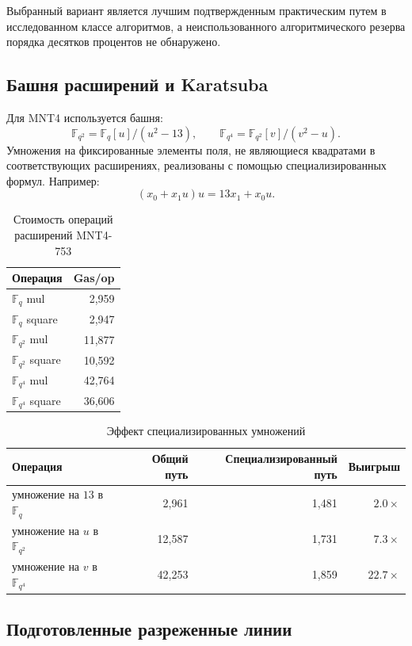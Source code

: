 \documentclass[12pt,a4paper]{article}
\newcommand{\Fq}{\mathbb{F}_q}
\begin{document}
Выбранный вариант является лучшим подтвержденным практическим путем в исследованном классе алгоритмов, а неиспользованного алгоритмического резерва порядка десятков процентов не обнаружено.

\subsection{Башня расширений и Karatsuba}

Для MNT4 используется башня:
\[
    \mathbb{F}_{q^2}=\Fq[u]/(u^2-13),
    \qquad
    \mathbb{F}_{q^4}=\mathbb{F}_{q^2}[v]/(v^2-u).
\]
Умножения на фиксированные элементы поля, не являющиеся квадратами в соответствующих расширениях, реализованы с помощью специализированных формул. Например:
\[
    (x_0+x_1u)u=13x_1+x_0u.
\]

\begin{table}[htbp]
\centering
\caption{Стоимость операций расширений MNT4-753}
\small
\begin{tabular}{l r}
\toprule
Операция & Gas/op \\
\midrule
$\Fq$ mul & 2,959 \\
$\Fq$ square & 2,947 \\
$\mathbb{F}_{q^2}$ mul & 11,877 \\
$\mathbb{F}_{q^2}$ square & 10,592 \\
$\mathbb{F}_{q^4}$ mul & 42,764 \\
$\mathbb{F}_{q^4}$ square & 36,606 \\
\bottomrule
\end{tabular}
\end{table}

\begin{table}[htbp]
\centering
\caption{Эффект специализированных умножений}
\small
\begin{tabular}{l r r r}
\toprule
Операция & Общий путь & Специализированный путь & Выигрыш \\
\midrule
умножение на $13$ в $\Fq$ & 2,961 & 1,481 & $2.0\times$ \\
умножение на $u$ в $\mathbb{F}_{q^2}$ & 12,587 & 1,731 & $7.3\times$ \\
умножение на $v$ в $\mathbb{F}_{q^4}$ & 42,253 & 1,859 & $22.7\times$ \\
\bottomrule
\end{tabular}
\end{table}

\subsection{Подготовленные разреженные линии}
\end{document}
